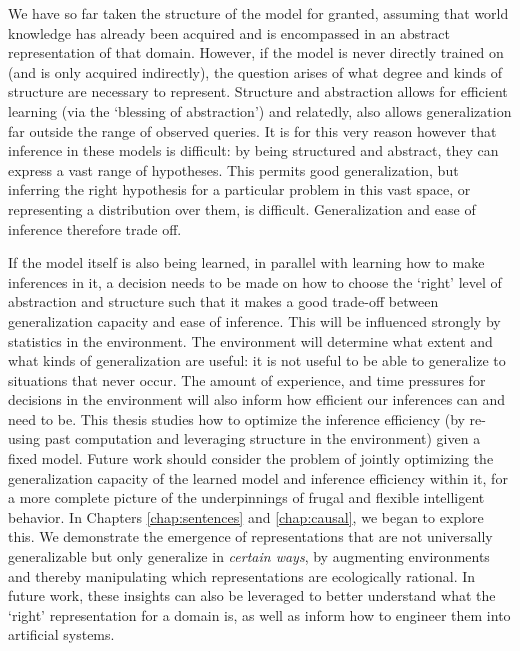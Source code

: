 We have so far taken the structure of the model for granted, assuming that world knowledge has already been acquired and is encompassed in an abstract representation of that domain. However, if the model is never directly trained on (and is only acquired indirectly), the question arises of what degree and kinds of structure are necessary to represent. Structure and abstraction allows for efficient learning (via the `blessing of abstraction'\citep{harlow1949formation, kemp2007learning, goodman1983fact}) and relatedly, also allows generalization far outside the range of observed queries. It is for this very reason however that inference in these models is difficult: by being structured and abstract, they can express a vast range of hypotheses. This permits good generalization, but inferring the right hypothesis for a particular problem in this vast space, or representing a distribution over them, is difficult. Generalization and ease of inference therefore trade off. 

If the model itself is also being learned, in parallel with learning how to make inferences in it, a decision needs to be made on how to choose the `right' level of abstraction and structure such that it makes a good trade-off between generalization capacity and ease of inference. This will be influenced strongly by statistics in the environment. The environment will determine what extent and what kinds of generalization are useful: it is not useful to be able to generalize to situations that never occur. The amount of experience, and time pressures for decisions in the environment will also inform how efficient our inferences can and need to be. This thesis studies how to optimize the inference efficiency (by re-using past computation and leveraging structure in the environment) given a fixed model. Future work should consider the problem of jointly optimizing the generalization capacity of the learned model and inference efficiency within it, for a more complete picture of the underpinnings of frugal and flexible intelligent behavior. In Chapters \ref{chap:sentences} and \ref{chap:causal}, we began to explore this. We demonstrate the emergence of representations that are not universally generalizable but only generalize in \textit{certain ways}, by augmenting environments and thereby manipulating which representations are ecologically rational. In future work, these insights can also be leveraged to better understand what the `right' representation for a domain is, as well as inform how to engineer them into artificial systems.

